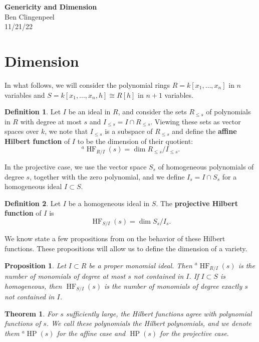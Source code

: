 \documentclass[11pt]{article}
\DeclareMathOperator{\HF}{HF}
\DeclareMathOperator{\HP}{HP}
\newtheorem{theorem}{Theorem}
\newtheorem{proposition}{Proposition}
\theoremstyle{definition}
\newtheorem{definition}{Definition}
\begin{document}
\begin{center}
	\Huge{\textbf{Genericity and Dimension}}\\
	\vspace{.5em}
	\normalsize{Ben Clingenpeel}\\
	11/21/22
\end{center}


\section*{Dimension}


In what follows, we will consider the polynomial rings $R = k[x_1, \dots, x_n]$ in $n$ variables and $S = k[x_1, \dots, x_n, h] \cong R[h]$ in $n + 1$ variables. 


\begin{definition}
	Let $I$ be an ideal in $R$, and consider the sets $R_{\leq s}$ of polynomials in $R$ with degree at most $s$ and $I_{\leq s} = I \cap R_{\leq s}$. Viewing these sets as vector spaces over $k$, we note that $I_{\leq s}$ is a subspace of $R_{\leq s}$ and define the \textbf{affine Hilbert function} of $I$ to be the dimension of their quotient: \[ ^a\HF_{R/I}(s) = \dim R_{\leq s} / I_{\leq s}. \] 
\end{definition}

In the projective case, we use the vector space $S_s$ of homogeneous polynomials of degree $s$, together with the zero polynomial, and we define $I_s = I \cap S_s$ for a homogeneous ideal $I \subset S$. 

\begin{definition}
	Let $I$ be a homogeneous ideal in $S$. The \textbf{projective Hilbert function} of $I$ is \[ \HF_{S/I}(s) = \dim S_s/I_s.  \]
\end{definition}


We know state a few propositions from \cite{cox2013ideals} on the behavior of these Hilbert functions. These propositions will allow us to define the dimension of a variety. 


\begin{proposition}
	Let $I \subset R$ be a proper monomial ideal. Then $^a\HF_{R/I}(s)$ is the number of monomials of degree at most $s$ not contained in $I$. If $I \subset S$ is homogeneous, then $\HF_{S/I}(s)$ is the number of monomials of degree exactly $s$ not contained in $I$. 
\end{proposition}


\begin{theorem}
	For $s$ sufficiently large, the Hilbert functions agree with polynomial functions of $s$. We call these polynomials the Hilbert polynomials, and we denote them $^a\HP(s)$ for the affine case and $\HP(s)$ for the projective case.
\end{theorem}
\end{document}
